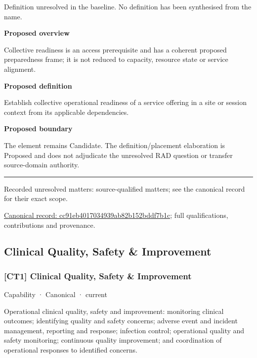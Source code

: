 Definition unresolved in the baseline. No definition has been synthesised from the name.



\textbf{Proposed overview}



Collective readiness is an access prerequisite and has a coherent proposed preparedness frame; it is not reduced to capacity, resource state or service alignment.



\textbf{Proposed definition}



Establish collective operational readiness of a service offering in a site or session context from its applicable dependencies.



\textbf{Proposed boundary}



The element remains Candidate. The definition/placement elaboration is Proposed and does not adjudicate the unresolved RAD question or transfer source-domain authority.



\medskip\hrule\medskip

{\small Recorded unresolved matters: source-qualified matters; see the canonical record for their exact scope.}\par
{\footnotesize \href{../../../../continuum/strategy/capability/cc91eb4017034939ab82b152bddf7b1c.md}{Canonical record: cc91eb4017034939ab82b152bddf7b1c}; full qualifications, contributions and provenance.}\par
\subsection{Clinical Quality, Safety \& Improvement}

\subsubsection{[CT1] Clinical Quality, Safety \& Improvement}

\label{element:63837bf848774572a06b935af95581a2}
{\small Capability · Canonical · current}\par

Operational clinical quality, safety and improvement: monitoring clinical outcomes; identifying quality and safety concerns; adverse event and incident management, reporting and response; infection control; operational quality and safety monitoring; continuous quality improvement; and coordination of operational responses to identified concerns.



